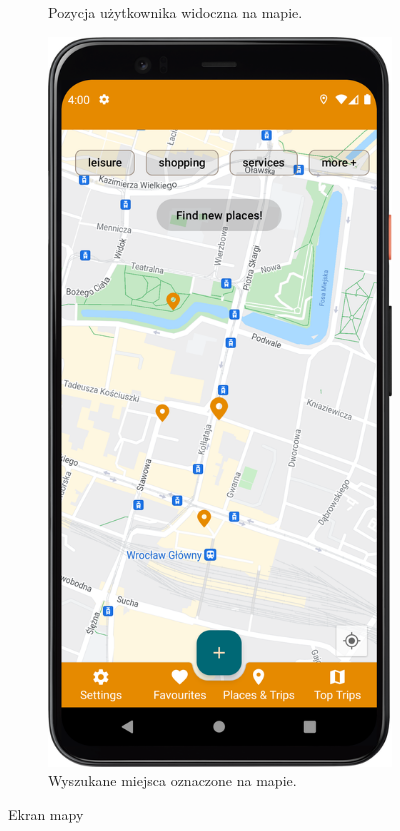 \begin{figure}[H]
\begin{subfigure}[b]{0.3\textwidth}
                \caption{Pozycja użytkownika widoczna na mapie.\label{map_fragment}}
            \end{subfigure}
            \hfill
            \begin{subfigure}[b]{0.3\textwidth}
                \centering
                \includegraphics[width=\textwidth]{src/app/find_new_places.png}
                \caption{Wyszukane miejsca oznaczone na mapie.\label{find_places}}
            \end{subfigure}
            \caption{Ekran mapy\label{map}}
            \qquad
        \end{figure} 
        
